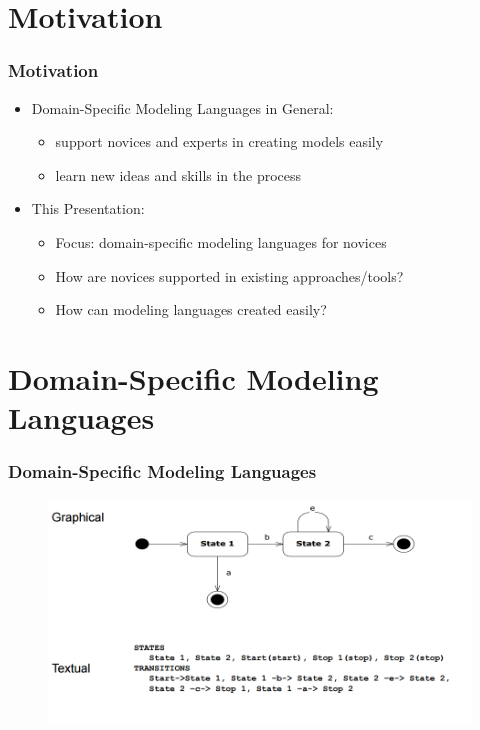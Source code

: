 \documentclass[11 pt,t]{beamer}
\begin{document}
\section{Motivation}
\begin{frame}

  \frametitle{Motivation}
  \begin{itemize}
    \vspace{1.0cm}
    \item Domain-Specific Modeling Languages in General:
    \begin{itemize}
      \item support novices and experts in creating models easily 
      \item learn new ideas and skills in the process 
    \end{itemize}
    \vspace{1.0cm}
    \item This Presentation:
     \begin{itemize}
      \item Focus: domain-specific modeling languages for novices
      \item How are novices supported in existing approaches/tools?
      \item How can modeling languages created easily?
    \end{itemize}
    
  \end{itemize}
\end{frame}

\section{Domain-Specific Modeling Languages}

\begin{frame}
\vspace{.5cm}
  \frametitle{Domain-Specific Modeling Languages}
    \begin{figure}[H]
      \centering
      \includegraphics[width=\textwidth]{../images/GraficalTextualComparison.PNG}
      \label{compare:textgraphiclang}
    \end{figure}
\end{frame}
\end{document}
